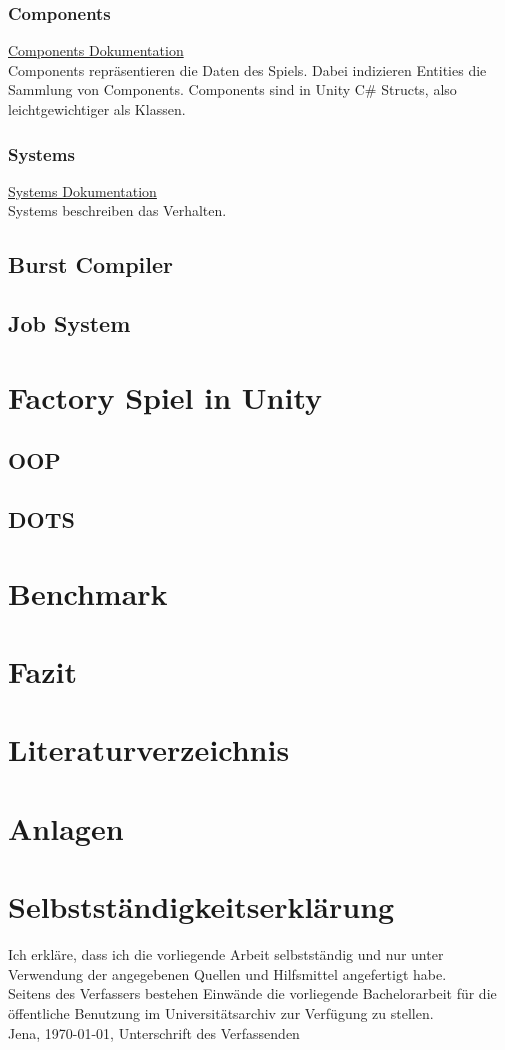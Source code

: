 \documentclass[12pt, titlepage]{article}
\begin{document}
\subsubsection{Components}
\href{https://docs.unity3d.com/Packages/com.unity.entities@0.1/manual/ecs_components.html}{Components Dokumentation}\\Components repräsentieren die Daten des Spiels. Dabei indizieren Entities die Sammlung von Components. Components sind in Unity C\# Structs, also leichtgewichtiger als Klassen.
\subsubsection{Systems}
\href{https://docs.unity3d.com/Packages/com.unity.entities@0.1/manual/ecs_systems.html}{Systems Dokumentation}\\
Systems beschreiben das Verhalten.
\subsection{Burst Compiler}
\subsection{Job System}
\newpage
\section{Factory Spiel in Unity}
\subsection{OOP}
\subsection{DOTS}
\newpage
\section{Benchmark}
\newpage
\section{Fazit}
\newpage
\section{Literaturverzeichnis}



\newpage
\section{Anlagen}
\newpage
\section{Selbstständigkeitserklärung}
Ich erkläre, dass ich die vorliegende Arbeit selbstständig und nur unter Verwendung der
angegebenen Quellen und Hilfsmittel angefertigt habe.\\
Seitens des Verfassers bestehen Einwände die vorliegende Bachelorarbeit für die öffentliche Benutzung im
Universitätsarchiv zur Verfügung zu stellen.\\
Jena, \today, Unterschrift des Verfassenden
\end{document}
